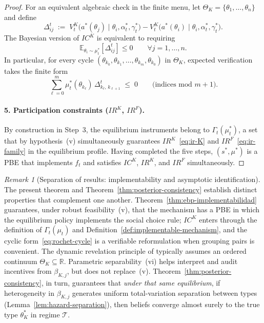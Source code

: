 \documentclass[12pt,a4paper]{article}
\providecommand{\textcite}{\citet}
\theoremstyle{plain}
\theoremstyle{definition}
\theoremstyle{remark}
\newtheorem{remark}[theorem]{Remark}
\newcommand{\1}{\mathbf{1}}
\begin{document}
\begin{proof}
For an equivalent algebraic check in the finite menu, let
$\Theta_K=\{\theta_1,\ldots,\theta_n\}$ and define
\[
\Delta_{ij}^t
\;:=\;
V^K_t\!\bigl(a^\ast(\theta_j)\mid\theta_i,\alpha_t^\ast,\gamma_t^\ast\bigr)
-
V^K_t\!\bigl(a^\ast(\theta_i)\mid\theta_i,\alpha_t^\ast,\gamma_t^\ast\bigr).
\]
The Bayesian version of $IC^K$ is equivalent to requiring
\[
\mathbb{E}_{\theta_i\sim\mu_t^\ast}\!\left[\Delta_{ij}^t\right]\le0
\qquad \forall j=1,\ldots,n.
\]
In particular, for every cycle $(\theta_{k_0},\theta_{k_1},\ldots,\theta_{k_m},\theta_{k_0})$
in $\Theta_K$, expected verification takes the finite form
\begin{equation}
\label{eq:rochet-cycle}
\sum_{\ell=0}^{m}
\mu_t^\ast(\theta_{k_\ell})\,
\Delta_{k_\ell,\,k_{\ell+1}}^t
\;\le\;0
\qquad\text{(indices mod }m+1\text{)}.
\end{equation}

\paragraph{5. Participation constraints \textup{(}$IR^K$, $IR^F$\textup{)}.}
By construction in Step~3, the equilibrium instruments belong to
$\Gamma_t(\mu_t^\ast)$, a set that by hypothesis~(v) simultaneously guarantees
$IR^K$~\eqref{eq:ir-K} and $IR^F$~\eqref{eq:ir-family} in the equilibrium profile.
Having completed the five steps, $(s^\ast,\mu^\ast)$ is a PBE that implements $f_t$ and
satisfies $IC^K$, $IR^K$, and $IR^F$ simultaneously.
\end{proof}

\begin{remark}[Separation of results: implementability and asymptotic identification]
The present theorem and Theorem~\ref{thm:posterior-consistency} establish distinct
properties that complement one another. Theorem~\ref{thm:ebp-implementabilidad}
guarantees, under robust feasibility~\textup{(v)}, that the mechanism has a PBE in
which the equilibrium policy implements the social choice rule; $IC^K$ enters through
the definition of $\Gamma_t(\mu_t)$ and Definition~\ref{def:implementable-mechanism},
and the cyclic form~\eqref{eq:rochet-cycle} is a verifiable reformulation when grouping
pairs is convenient. The dynamic revelation principle of \textcite{PavanSegalToikka2014}
typically assumes an ordered continuum $\Theta_K\subseteq\mathbb{R}$. Parametric
separability~\textup{(vi)} helps interpret and audit incentives from $\beta_{K,j}$, but
does not replace~\textup{(v)}. Theorem~\ref{thm:posterior-consistency}, in turn,
guarantees that \emph{under that same equilibrium}, if heterogeneity in $\beta_{K,j}$
generates uniform total-variation separation between types
(Lemma~\ref{lem:hazard-separation}), then beliefs converge almost surely to the true
type $\theta_K^\ast$ in regime $\mathcal{T}$.
\end{remark}
\end{document}
